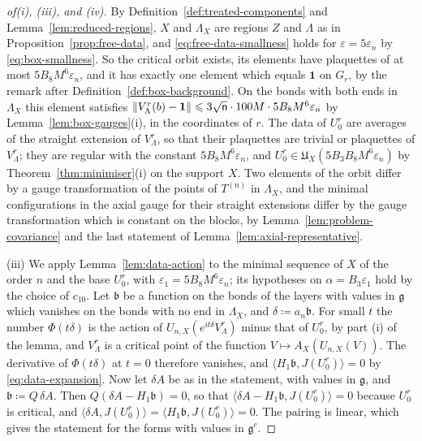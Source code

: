 \documentclass[11pt]{preprint}
\newcommand{\id}{\mathbf 1}
\DeclarePairedDelimiter{\norm}{\lVert}{\rVert}
\numberwithin{equation}{section}
\begin{document}
\begin{proof}[of\emph{(i)}, \emph{(iii)}, and \emph{(iv)}]
By Definition~\ref{def:treated-components} and Lemma~\ref{lem:reduced-regions}, $X$ and $\Lambda_X$ are regions $Z$ and $\Lambda$ as in Proposition~\ref{prop:free-data}, and \eqref{eq:free-data-smallness} holds for $\varepsilon = 5\varepsilon_n$ by \eqref{eq:box-smallness}. So the critical orbit exists, its elements have plaquettes of at most $5B_8M^6\varepsilon_n$, and it has exactly one element which equals $\id$ on $G_r$, by the remark after Definition~\ref{def:box-background}. On the bonds with both ends in $\Lambda_X$ this element satisfies $\norm{V^r_\Lambda(b) - \id} \leqslant 3\sqrt{\mathsf n} \cdot 100M \cdot 5B_8M^6\varepsilon_n$ by Lemma~\ref{lem:box-gauges}(i), in the coordinates of $r$. The data of $U^r_0$ are averages of the straight extension of $V^r_\Lambda$, so that their plaquettes are trivial or plaquettes of $V^r_\Lambda$; they are regular with the constant $5B_8M^6\varepsilon_n$, and $U^r_0 \in \mathfrak U_X(5B_3B_8M^6\varepsilon_n)$ by Theorem~\ref{thm:minimiser}(i) on the support $X$. Two elements of the orbit differ by a gauge transformation of the points of $T^{(n)}$ in $\Lambda_X$, and the minimal configurations in the axial gauge for their straight extensions differ by the gauge transformation which is constant on the blocks, by Lemma~\ref{lem:problem-covariance} and the last statement of Lemma~\ref{lem:axial-representative}.

(iii) We apply Lemma~\ref{lem:data-action} to the minimal sequence of $X$ of the order $n$ and the base $U^r_0$, with $\varepsilon_1 = 5B_8M^6\varepsilon_n$; its hypotheses on $\alpha = B_3\varepsilon_1$ hold by the choice of $c_{10}$. Let $\mathfrak b$ be a function on the bonds of the layers with values in $\mathfrak g$ which vanishes on the bonds with no end in $\Lambda_X$, and $\delta \coloneqq a_n\mathfrak b$. For small $t$ the number $\Phi(t\delta)$ is the action of $U_{n,X}(e^{it\delta}V^r_\Lambda)$ minus that of $U^r_0$, by part (i) of the lemma, and $V^r_\Lambda$ is a critical point of the function $V \mapsto A_X(U_{n,X}(V))$. The derivative of $\Phi(t\delta)$ at $t = 0$ therefore vanishes, and $\langle H_1\mathfrak b, J(U^r_0)\rangle = 0$ by \eqref{eq:data-expansion}. Now let $\delta A$ be as in the statement, with values in $\mathfrak g$, and $\mathfrak b \coloneqq Q\,\delta A$. Then $Q(\delta A - H_1\mathfrak b) = 0$, so that $\langle\delta A - H_1\mathfrak b, J(U^r_0)\rangle = 0$ because $U^r_0$ is critical, and $\langle\delta A, J(U^r_0)\rangle = \langle H_1\mathfrak b, J(U^r_0)\rangle = 0$. The pairing is linear, which gives the statement for the forms with values in $\mathfrak g^c$.


\end{proof}
\end{document}
